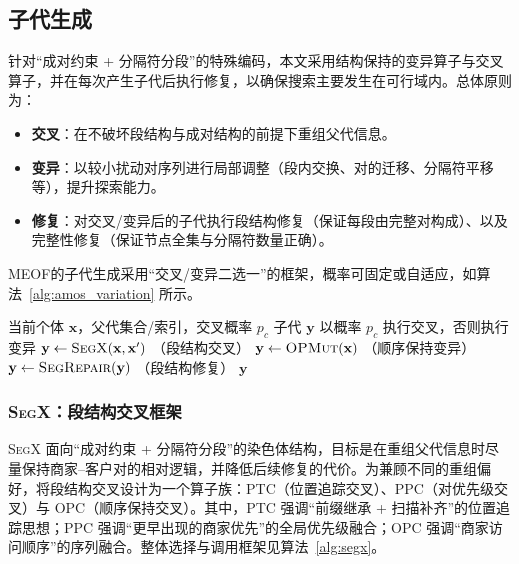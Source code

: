 \subsection{子代生成}
\label{sec:amos_variation}

针对“成对约束 + 分隔符分段”的特殊编码，本文采用结构保持的变异算子与交叉算子，并在每次产生子代后执行修复，以确保搜索主要发生在可行域内。总体原则为：
\begin{itemize}
	\item \textbf{交叉}：在不破坏段结构与成对结构的前提下重组父代信息。
	\item \textbf{变异}：以较小扰动对序列进行局部调整（段内交换、对的迁移、分隔符平移等），提升探索能力。
	\item \textbf{修复}：对交叉/变异后的子代执行段结构修复（保证每段由完整对构成）、以及完整性修复（保证节点全集与分隔符数量正确）。
\end{itemize}

MEOF的子代生成采用“交叉/变异二选一”的框架，概率可固定或自适应，如算法~\ref{alg:amos_variation} 所示。

\begin{algorithm}[H]
	\caption{Variation}
	\label{alg:amos_variation}
	\begin{algorithmic}[1]
		\REQUIRE 当前个体 $\mathbf{x}$，父代集合/索引，交叉概率 $p_c$
		\ENSURE 子代 $\mathbf{y}$
		\STATE 以概率 $p_c$ 执行交叉，否则执行变异
		\STATE $\mathbf{y} \leftarrow \textsc{SegX}(\mathbf{x},\mathbf{x}')$ \hfill（段结构交叉）
		\ELSE
		\STATE $\mathbf{y} \leftarrow \textsc{OPMut}(\mathbf{x})$ \hfill（顺序保持变异）
		\ENDIF
		\STATE $\mathbf{y} \leftarrow \textsc{SegRepair}(\mathbf{y})$ \hfill（段结构修复）
		\RETURN $\mathbf{y}$
	\end{algorithmic}
\end{algorithm}

\subsubsection{\textsc{SegX}：段结构交叉框架}
\textsc{SegX} 面向“成对约束 + 分隔符分段”的染色体结构，目标是在重组父代信息时尽量保持商家--客户对的相对逻辑，并降低后续修复的代价。为兼顾不同的重组偏好，将段结构交叉设计为一个算子族：PTC（位置追踪交叉）、PPC（对优先级交叉）与 OPC（顺序保持交叉）。其中，PTC 强调“前缀继承 + 扫描补齐”的位置追踪思想；PPC 强调“更早出现的商家优先”的全局优先级融合；OPC 强调“商家访问顺序”的序列融合。整体选择与调用框架见算法~\ref{alg:segx}。

